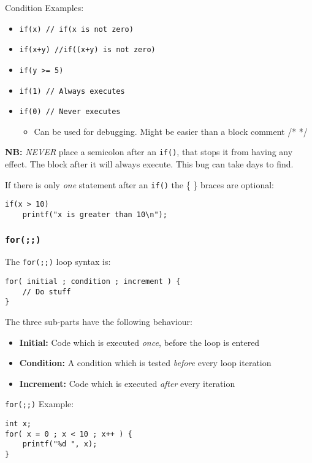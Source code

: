 \documentclass{lab}
\begin{document}
\begin{multicols}{2}
Condition Examples:
\begin{itemize}
\item \texttt{if(x) // if(x is not zero)}
\item \texttt{if(x+y) //if((x+y) is not zero)}
\item \texttt{if(y >= 5)}
\item \texttt{if(1) // Always executes}
\item \texttt{if(0) // Never executes}
	\begin{itemize}
		\item Can be used for debugging. Might be easier than a block comment /* */
	\end{itemize}
\end{itemize}

\textbf{NB:} \textit{NEVER} place a semicolon after an \texttt{if()}, that stops it from having any effect. The block after it will always execute. This bug can take days to find.

If there is only \textit{one} statement after an \texttt{if()} the \{ \} braces are optional:

\begin{lstlisting}[style=CStyle]
if(x > 10) 
	printf("x is greater than 10\n");
\end{lstlisting}

\subsubsection{\texttt{for(;;)}}

The \texttt{for(;;)} loop syntax is:

\begin{lstlisting}[style=CStyle]
for( initial ; condition ; increment ) {
	// Do stuff
}
\end{lstlisting}

The three sub-parts have the following behaviour:

\begin{itemize}
\item \textbf{Initial:} Code which is executed \textit{once}, before the loop is entered
\item \textbf{Condition:} A condition which is tested \textit{before} every loop iteration
\item \textbf{Increment:} Code which is executed \textit{after} every iteration
\end{itemize}

\texttt{for(;;)} Example:

\begin{lstlisting}[style=CStyle]
int x;
for( x = 0 ; x < 10 ; x++ ) {
	printf("%d ", x);
}
\end{lstlisting}


\end{multicols}
\end{document}
